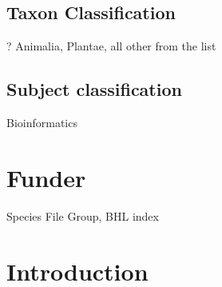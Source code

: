 \documentclass[
]{article}
\begin{document}
\hypertarget{taxon-classification}{%
\subsection{Taxon Classification}\label{taxon-classification}}

? Animalia, Plantae, all other from the list

\hypertarget{subject-classification}{%
\subsection{Subject classification}\label{subject-classification}}

Bioinformatics

\hypertarget{funder}{%
\section{Funder}\label{funder}}

Species File Group, BHL index

\hypertarget{introduction}{%
\section{Introduction}\label{introduction}}
\end{document}
